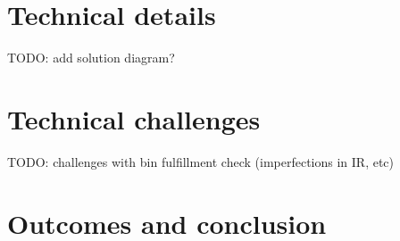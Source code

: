 \documentclass{article}
\begin{document}
\section{Technical details}
TODO: add solution diagram?

\section{Technical challenges}
TODO: challenges with bin fulfillment check (imperfections in IR, etc)

\section{Outcomes and conclusion}
\end{document}
